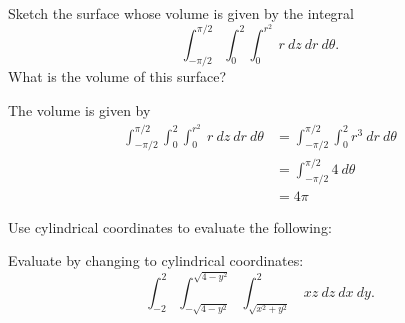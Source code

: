 \documentclass[12pt]{exam}
\begin{document}
\begin{questions}

 \newpage

\question Sketch the surface whose volume is given by the integral
\[
        \int_{-\pi/2}^{\pi/2}\int_0^2\int_0^{r^2}~r~dz~dr~d\theta.
\]
What is the volume of this surface?
\ifprintanswers
        \begin{solution}
            The volume is given by 
            \begin{align*}
            \int_{-\pi/2}^{\pi/2}\int_0^2\int_0^{r^2}~r~dz~dr~d\theta & = \int_{-\pi/2}^{\pi/2}\int_0^2 r^3~dr~d\theta\\
            &= \int_{-\pi/2}^{\pi/2} 4~d\theta\\
            &= 4\pi
            \end{align*}
        \end{solution}
    \else
        \vfill
    \fi 

 \question Use cylindrical coordinates to evaluate the following:

 \newpage

 \question Evaluate by changing to cylindrical coordinates:
    \[
        \int_{-2}^{2}\int_{-\sqrt{4-y^2}}^{\sqrt{4-y^2}}\int_{\sqrt{x^2+y^2}}^2~xz~dz~dx~dy.
    \]

\end{questions}
\end{document}
